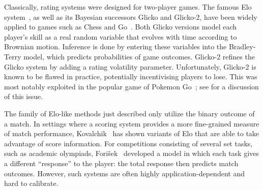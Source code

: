 
Classically, rating systems were designed for two-player games. The famous Elo system~\cite{E61}, as well as its Bayesian successors Glicko and Glicko-2, have been widely applied to games such as Chess and Go~\cite{G95, G99, G12}. Both Glicko versions model each player's skill as a real random variable that evolves with time according to Brownian motion. Inference is done by entering these variables into the Bradley-Terry model, which predicts probabilities of game outcomes. Glicko-2 refines the Glicko system by adding a rating volatility parameter. Unfortunately, Glicko-2 is known to be flawed in practice, potentially incentivising players to lose. This was most notably exploited in the popular game of Pokemon Go~\cite{pokemongo}; see  for a discussion of this issue.

The family of Elo-like methods just described only utilize the binary outcome of a match. In settings where a scoring system provides a more fine-grained measure of match performance, Kovalchik~\cite{K20} has shown variants of Elo that are able to take advantage of score information. For competitions consisting of several set tasks, such as academic olympiads, Fori{\v{s}}ek~\cite{forivsektheoretical} developed a model in which each task gives a different ``response'' to the player: the total response then predicts match outcomes. However, such systems are often highly application-dependent and hard to calibrate.

